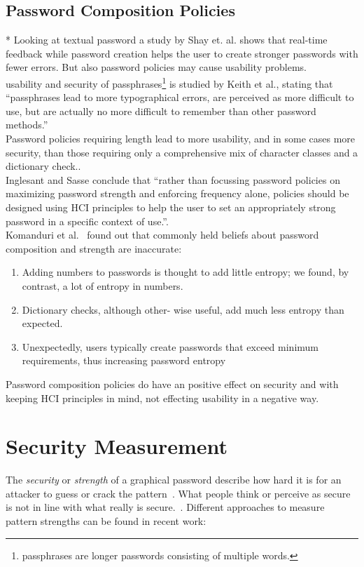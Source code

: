 \documentclass[twocolumn, a4paper, 10pt]{article}
\begin{document}
\subsection{Password Composition Policies}
\label{sec:related:policies}
* Looking at textual password a study by Shay et. al. shows that real-time feedback while password creation helps the user to create stronger passwords with fewer errors. But also password policies may cause usability problems. \cite{Shay:2015:SSI:2702123.2702586}\\
usability and security of passphrases\footnote{passphrases are longer passwords consisting of multiple words.} is studied by Keith et al.\cite{Keith200717}, stating that ``passphrases lead to more typographical errors, are perceived as more difficult to use, but are actually no more difficult to remember than other password methods.''\\
Password policies requiring length lead to more usability, and in some cases more security, than those requiring only a comprehensive mix of character classes and a dictionary check.\cite{Shay:2014:LPS:2556288.2557377}.\\
Inglesant and Sasse\cite{Inglesant:2010:TCU:1753326.1753384} 
conclude that ``rather than focussing password policies on maximizing password strength and enforcing frequency alone, policies should be designed using HCI principles to help the user to set an appropriately strong password in a specific context of use.''.\\
Komanduri et al.~\cite{Komanduri:2011:PPM:1978942.1979321} found out that commonly held beliefs about password composition and strength are inaccurate:
\begin{enumerate}
	\item Adding numbers to passwords is thought to add little entropy; we found, by contrast, a lot of entropy in numbers.
	\item Dictionary checks, although other- wise useful, add much less entropy than expected.
	\item Unexpectedly, users typically create passwords that exceed minimum requirements, thus increasing password entropy
\end{enumerate}

Password composition policies do have an positive effect on security and with keeping HCI principles in mind, not effecting usability in a negative way.

\section{Security Measurement}
\label{sec:security}
The \emph{security} or \emph{strength} of a graphical password describe how hard it is for an attacker to guess or crack the pattern~\cite{Keith200717}. What people think or perceive as secure is not in line with what really is secure.~\cite{Aviv:2014:UVP:2664243.2664253}. Different approaches to measure pattern strengths can be found in recent work:
\end{document}
